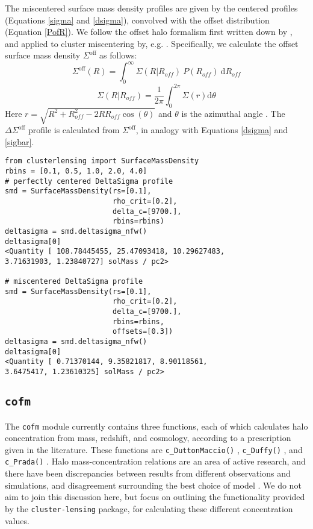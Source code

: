 \documentclass[twocolumn]{aastex6}
\newcommand{\code}{\lstinline[style=codeintext]}
\newcommand{\hcode}{\large\normalfont\texttt} %
\begin{document}
The miscentered surface mass density profiles are given by the centered profiles (Equations \ref{sigma} and \ref{dsigma}), convolved with the offset distribution (Equation \ref{PofR}). We follow the offset halo formalism first written down by \citet{Yang06}, and applied to cluster miscentering by, e.g. \citet{Johnston07, George12, Ford14, Ford15, Simet16}. Specifically, we calculate the offset surface mass density $\Sigma^\mathrm{off}$ as follows:
\begin{equation}\label{sigma_off}
\Sigma^\mathrm{off}(R) = \int_{0}^{\infty} \Sigma(R | R_{off})\ P(R_{off})\  \mathrm{d}R_{off}
\end{equation}
\begin{equation}\label{sigma_RgivenRoff}
\Sigma(R|R_{off})=\frac{1}{2\pi}\int_{0}^{2\pi}\Sigma(r) \mathrm{d}\theta
\end{equation}
Here $r = \sqrt{R^2+R_{off}^2-2RR_{off}\cos(\theta)}$ and $\theta$ is the azimuthal angle \citep{Yang06}. The $\Delta\Sigma^\mathrm{off}$ profile is calculated from $\Sigma^\mathrm{off}$, in analogy with Equations \ref{dsigma} and \ref{sigbar}.

\begin{lstlisting}
from clusterlensing import SurfaceMassDensity
rbins = [0.1, 0.5, 1.0, 2.0, 4.0]
# perfectly centered DeltaSigma profile
smd = SurfaceMassDensity(rs=[0.1],
                         rho_crit=[0.2],
                         delta_c=[9700.],
                         rbins=rbins)
deltasigma = smd.deltasigma_nfw()
deltasigma[0]
<Quantity [ 108.78445455, 25.47093418, 10.29627483,
3.71631903, 1.23840727] solMass / pc2>

# miscentered DeltaSigma profile
smd = SurfaceMassDensity(rs=[0.1],
                         rho_crit=[0.2],
                         delta_c=[9700.],
                         rbins=rbins,
                         offsets=[0.3])
deltasigma = smd.deltasigma_nfw()
deltasigma[0]
<Quantity [ 0.71370144, 9.35821817, 8.90118561,
3.6475417, 1.23610325] solMass / pc2>
\end{lstlisting}


\subsection{\hcode{cofm}}
\label{cofm}

The \code{cofm} module currently contains three functions, each of which calculates halo concentration from mass, redshift, and cosmology, according to a prescription given in the literature. These functions are \code{c_DuttonMaccio()} \citep[for calculations following][]{Dutton14}, \code{c_Duffy()} \citep[following][]{Duffy08}, and \code{c_Prada()} \citep[for][]{Prada12}. Halo mass-concentration relations are an area of active research, and there have been discrepancies between results from different observations and simulations, and disagreement surrounding the best choice of model \citep[see e.g.][]{Dutton14, Klypin16}. We do not aim to join this discussion here, but focus on outlining the functionality provided by the \code{cluster-lensing} package, for calculating these different concentration values.
\end{document}

